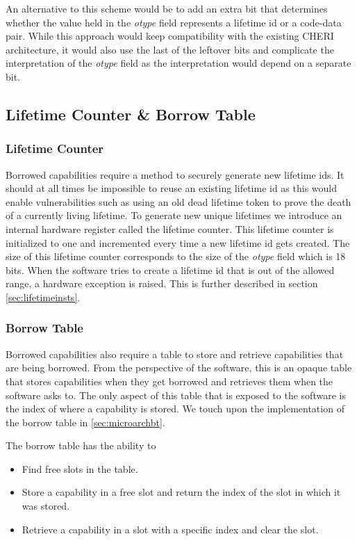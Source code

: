 An alternative to this scheme would be to add an extra bit that determines whether the value held in the \textit{otype} field represents a lifetime id or a code-data pair. While this approach would keep compatibility with the existing CHERI architecture, it would also use the last of the leftover bits and complicate the interpretation of the \textit{otype} field as the interpretation would depend on a separate bit.

\subsection{Lifetime Counter \& Borrow Table}
\label{sec:lcbt}
\subsubsection{Lifetime Counter}
Borrowed capabilities require a method to securely generate new lifetime ids. It should at all times be impossible to reuse an existing lifetime id as this would enable vulnerabilities such as using an old dead lifetime token to prove the death of a currently living lifetime. To generate new unique lifetimes we introduce an internal hardware register called the lifetime counter. This lifetime counter is initialized to one and incremented every time a new lifetime id gets created. The size of this lifetime counter corresponds to the size of the \textit{otype} field which is 18 bits. When the software tries to create a lifetime id that is out of the allowed range, a hardware exception is raised. This is further described in section \ref{sec:lifetimeinsts}.

\subsubsection{Borrow Table}
Borrowed capabilities also require a table to store and retrieve capabilities that are being borrowed. From the perspective of the software, this is an opaque table that stores capabilities when they get borrowed and retrieves them when the software asks to. The only aspect of this table that is exposed to the software is the index of where a capability is stored. We touch upon the implementation of the borrow table in \ref{sec:microarchbt}.

The borrow table has the ability to
\begin{itemize}
\item Find free slots in the table.
\item Store a capability in a free slot and return the index of the slot in which it was stored.
\item Retrieve a capability in a slot with a specific index and clear the slot.
\end{itemize}

